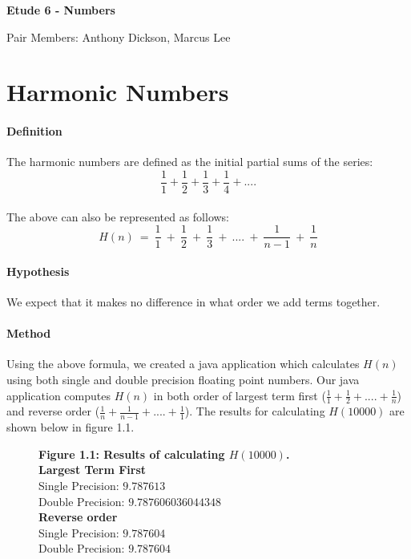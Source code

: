 \documentclass[12pt]{article}
\begin{document}
	
\begin{center}
\begin{LARGE}
\textbf{Etude 6 - Numbers}\\
\end{LARGE}
Pair Members: Anthony Dickson, Marcus Lee
\end{center}

\section{Harmonic Numbers}
\paragraph{Definition}
	The harmonic numbers are defined as the initial partial sums of the series:
	{\large $$\frac{1}{1} + \frac{1}{2} + \frac{1}{3} + \frac{1}{4} + ....$$}\\
	The above can also be represented as follows:
	{\large $$H(n)\ = \ \frac{1}{1} \ + \ \frac{1}{2} \ + \ \frac{1}{3} \ + \ .... \ +  \ \frac{1}{n-1} \ + \ \frac{1}{n}$$}
	
\paragraph{Hypothesis}
	We expect that it makes no difference in what order we add terms together.

\paragraph{Method}
	Using the above formula, we created a java application which calculates $H(n)$ using both single and double precision floating point numbers. Our java application computes $H(n)$ in both order of largest term first ($\frac{1}{1} + \frac{1}{2} +  .... + \frac{1}{n}$) and reverse order ($\frac{1}{n} + \frac{1}{n - 1} +  .... + \frac{1}{1}$). The results for calculating $H(10000)$ are shown below in figure 1.1.
	
\begin{figure}[h]
	\textbf{Figure 1.1: Results of calculating $H(10000)$.}\\
	\textbf{Largest Term First}\\
	Single Precision: $9.787613$\\
	Double Precision: $9.787606036044348$\\
	\textbf{Reverse order}\\
	Single Precision: $9.787604$\\
	Double Precision: $9.787604$	
\end{figure}
\end{document}
